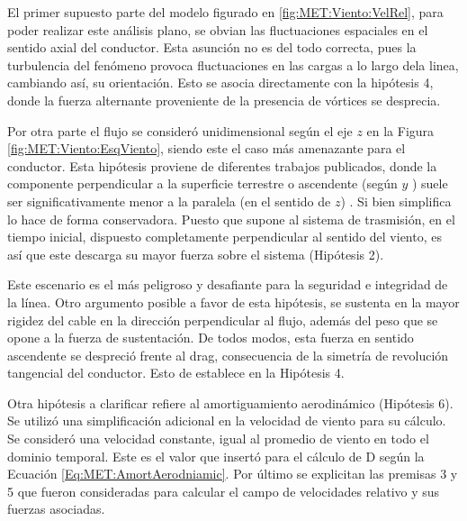 El primer supuesto parte del modelo figurado en \ref{fig:MET:Viento:VelRel}, para poder realizar este análisis plano, se obvian las fluctuaciones espaciales en el sentido axial del conductor. Esta asunción no es del todo correcta, pues la turbulencia del fenómeno provoca fluctuaciones en las cargas a lo largo dela linea, cambiando así, su orientación.  Esto se asocia directamente con la hipótesis 4, donde la fuerza alternante proveniente de la presencia de vórtices se desprecia. 

Por otra parte el flujo se consideró unidimensional según el eje $z$ en la Figura \ref{fig:MET:Viento:EsqViento}, siendo este el caso más amenazante para el conductor. Esta hipótesis proviene de diferentes trabajos publicados, donde la componente perpendicular a la superficie terrestre o ascendente (según $y$ ) suele ser significativamente menor a la paralela (en el sentido de $z$) \citep{duranona2009analysis} \citep{stengel2017measurements} \cite{yang2016nonlinear}. Si bien simplifica lo hace de forma conservadora.  Puesto que supone al sistema de trasmisión, en el tiempo inicial, dispuesto completamente perpendicular al sentido del viento, es así que este descarga su mayor fuerza sobre el sistema (Hipótesis 2). 

Este escenario es el más peligroso y desafiante para la seguridad e integridad de la línea. Otro argumento posible a favor de esta hipótesis, se sustenta en la mayor rigidez del cable en la dirección perpendicular al flujo, además del peso que se opone a la fuerza de sustentación. De todos modos, esta fuerza en sentido ascendente se despreció frente al drag, consecuencia de la simetría de revolución tangencial del conductor. Esto de establece en la Hipótesis 4. 
 
Otra hipótesis a clarificar refiere al amortiguamiento aerodinámico (Hipótesis 6). Se utilizó una simplificación adicional en la velocidad de viento para su cálculo. Se consideró una velocidad constante, igual al promedio de viento en todo el dominio temporal. Este es el valor que insertó para el cálculo de D según la Ecuación \eqref{Eq:MET:AmortAerodniamic}. Por último se explicitan las premisas 3 y 5 que fueron consideradas para calcular el campo de velocidades relativo y sus fuerzas asociadas.  